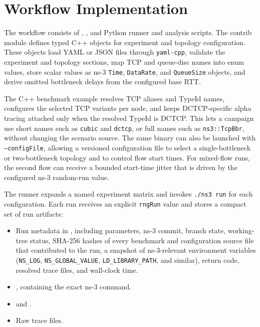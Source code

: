 \section{Workflow Implementation}

The workflow consists of \TcpAqmModule{}, \TcpAqmBenchmark{}, and Python runner and analysis scripts. The contrib module defines typed C++ objects for experiment and topology configuration. These objects load YAML or JSON files through \texttt{yaml-cpp}, validate the experiment and topology sections, map TCP and queue-disc names into enum values, store scalar values as ns-3 \texttt{Time}, \texttt{DataRate}, and \texttt{QueueSize} objects, and derive omitted bottleneck delays from the configured base RTT.

The C++ benchmark example resolves TCP aliases and TypeId names, configures the selected TCP variants per node, and keeps DCTCP-specific alpha tracing attached only when the resolved TypeId is DCTCP. This lets a campaign use short names such as \texttt{cubic} and \texttt{dctcp}, or full names such as \texttt{ns3::TcpBbr}, without changing the scenario source. The same binary can also be launched with \texttt{--configFile}, allowing a versioned configuration file to select a single-bottleneck or two-bottleneck topology and to control flow start times. For mixed-flow runs, the second flow can receive a bounded start-time jitter that is driven by the configured ns-3 random-run value.

The runner expands a named experiment matrix and invokes \texttt{./ns3 run} for each configuration. Each run receives an explicit \texttt{rngRun} value and stores a compact set of run artifacts:\RunArtifactPaths{}

\begin{itemize}
  \item Run metadata in \MetadataFile{}, including parameters, ns-3 commit, branch state, working-tree status, SHA-256 hashes of every benchmark and configuration source file that contributed to the run, a snapshot of ns-3-relevant environment variables (\texttt{NS\_LOG}, \texttt{NS\_GLOBAL\_VALUE}, \texttt{LD\_LIBRARY\_PATH}, and similar), return code, resolved trace files, and wall-clock time.
  \item \CommandFile{}, containing the exact ns-3 command.
  \item \StdoutFile{} and \StderrFile{}.
  \item Raw \TraceGlob{} trace files.
\end{itemize}


